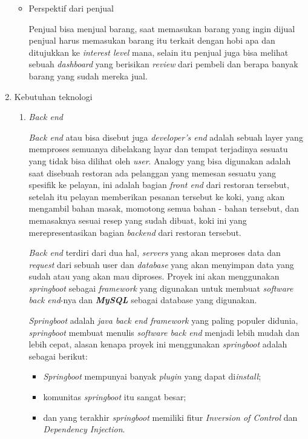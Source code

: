 \documentclass[a4paper]{article}
\begin{document}
\begin{enumerate}[label=\alph*. ]
\begin{itemize}
              \item Perspektif dari penjual

                    Penjual bisa menjual barang, saat memasukan barang yang ingin dijual penjual harus memasukan barang itu terkait dengan hobi apa dan ditujukkan ke \textit{interest level} mana, selain itu penjual juga bisa melihat sebuah \textit{dashboard} yang berisikan \textit{review} dari pembeli dan berapa banyak barang yang sudah mereka jual.
          \end{itemize}


    \item Kebutuhan teknologi

          \begin{enumerate}
              \item \textit{Back end}

                    \textit{Back end} atau bisa disebut juga \textit{developer's end} adalah sebuah layer yang memproses semuanya dibelakang layar dan tempat terjadinya sesuatu yang tidak bisa dilihat oleh \textit{user}\autocite{letsgodojo-frontend-backend}. Analogy yang bisa digunakan adalah saat disebuah restoran ada pelanggan yang memesan sesuatu yang spesifik ke pelayan, ini adalah bagian \textit{front end} dari restoran tersebut, setelah itu pelayan memberikan pesanan tersebut ke koki, yang akan mengambil bahan masak, momotong semua bahan - bahan tersebut, dan memasaknya sesuai resep yang sudah dibuat, koki ini yang merepresentasikan bagian \textit{backend} dari restoran tersebut\autocite{codecademy-backend}.

                    \textit{Back end} terdiri dari dua hal, \textit{servers} yang akan meproses data dan \textit{request} dari sebuah user dan \textit{database} yang akan menyimpan data yang sudah atau yang akan mau diproses\autocite{codecademy-backend}. Proyek ini akan menggunakan \textit{springboot} sebagai \textit{framework} yang digunakan untuk membuat \textit{software back end}-nya dan \textit{\textbf{MySQL}} sebagai database yang digunakan.

                    \textit{Springboot} adalah \textit{java back end framework} yang paling populer didunia, \textit{springboot} membuat menulis \textit{software back end} menjadi lebih mudah dan lebih cepat\autocite{spring-framework}, alasan kenapa proyek ini menggunakan \textit{springboot} adalah sebagai berikut:
                    \begin{itemize}
                        \item \textit{Springboot} mempunyai banyak \textit{plugin} yang dapat di\textit{install};
                        \item komunitas \textit{springboot} itu sangat besar;
                        \item dan yang terakhir \textit{springboot} memiliki fitur \textit{Inversion of Control} dan \textit{Dependency Injection}.
                    \end{itemize}


\end{enumerate}
\end{enumerate}
\end{document}
